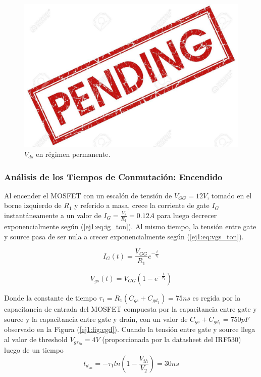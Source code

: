\begin{figure}[H]
	\centering
	\includegraphics[width=0.8\linewidth]{ImagenesEjercicio-1/pend}
	\caption{$V_{ds}$ en régimen permanente.}
	\label{ej1:fig:vds_permanente}
\end{figure}

\subsubsection{Análisis de los Tiempos de Conmutación: Encendido}

Al encender el MOSFET con un escalón de tensión de $V_{GG} = 12V$, tomado en el borne izquierdo de $R_1$ y referido a masa, crece la corriente de gate $I_G$ instantáneamente a un valor de $I_G = \frac{V_i}{R_1} = 0.12A$ para luego decrecer exponencialmente según (\ref{ej1:eq:ig_ton}). Al mismo tiempo, la tensión entre gate y source pasa de ser nula a crecer exponencialmente según (\ref{ej1:eq:vgs_ton}).

\begin{equation}
I_G(t) = \frac{V_{GG}}{R_1}e^{-\frac{t}{\tau_1}}
\label{ej1:eq:ig_ton}
\end{equation}

\begin{equation}
V_{gs}(t) = V_{GG}(1-e^{-\frac{t}{\tau_1}})
\label{ej1:eq:vgs_ton}
\end{equation}

Donde la constante de tiempo $\tau_1 = R_1 (C_{gs}+C_{gd_{1}}) = 75ns$ es regida por la capacitancia de entrada del MOSFET compuesta por la capacitancia entre gate y source y la capacitancia entre gate y drain, con un valor de $C_{gs}+C_{gd_{1}} = 750pF$ observado en la Figura (\ref{ej1:fig:cgd}). Cuando la tensión entre gate y source llega al valor de threshold $V_{gs_{th}} = 4V$ (proporcionada por la datasheet del IRF530) luego de un tiempo 
\begin{equation}
t_{d_{on}} = -\tau_1 ln\left( 1-\frac{V_{th}}{V_2} \right) = 30ns
\label{ej1:eq:tdon}
\end{equation}

